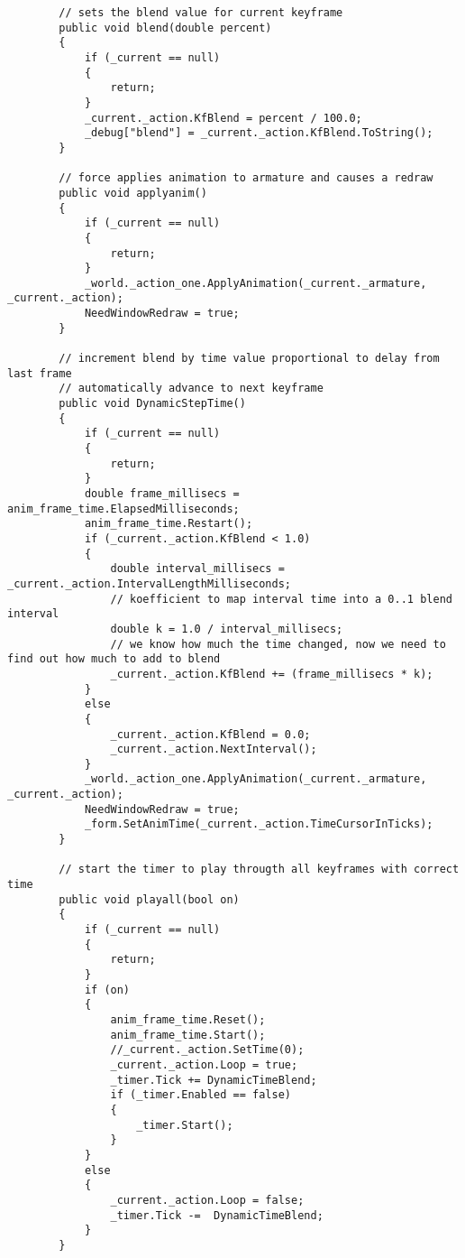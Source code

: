 \begin{scriptsize}
\begin{verbatim}
        // sets the blend value for current keyframe
        public void blend(double percent)
        {
            if (_current == null)
            {
                return;
            }
            _current._action.KfBlend = percent / 100.0;
            _debug["blend"] = _current._action.KfBlend.ToString();
        }

        // force applies animation to armature and causes a redraw
        public void applyanim()
        {
            if (_current == null)
            {
                return;
            }
            _world._action_one.ApplyAnimation(_current._armature, _current._action);
            NeedWindowRedraw = true;
        }

        // increment blend by time value proportional to delay from last frame
        // automatically advance to next keyframe
        public void DynamicStepTime()
        {
            if (_current == null)
            {
                return;
            }
            double frame_millisecs = anim_frame_time.ElapsedMilliseconds;
            anim_frame_time.Restart();
            if (_current._action.KfBlend < 1.0)
            {
                double interval_millisecs = _current._action.IntervalLengthMilliseconds;
                // koefficient to map interval time into a 0..1 blend interval
                double k = 1.0 / interval_millisecs;
                // we know how much the time changed, now we need to find out how much to add to blend 
                _current._action.KfBlend += (frame_millisecs * k);
            }
            else
            {
                _current._action.KfBlend = 0.0;
                _current._action.NextInterval();
            }
            _world._action_one.ApplyAnimation(_current._armature, _current._action);
            NeedWindowRedraw = true;
            _form.SetAnimTime(_current._action.TimeCursorInTicks);
        }

        // start the timer to play througth all keyframes with correct time
        public void playall(bool on)
        {
            if (_current == null)
            {
                return;
            }
            if (on)
            {
                anim_frame_time.Reset();
                anim_frame_time.Start();
                //_current._action.SetTime(0);
                _current._action.Loop = true;
                _timer.Tick += DynamicTimeBlend;
                if (_timer.Enabled == false)
                {
                    _timer.Start();
                }
            }
            else
            {
                _current._action.Loop = false;
                _timer.Tick -=  DynamicTimeBlend;
            }
        }


\end{verbatim}
\end{scriptsize}

